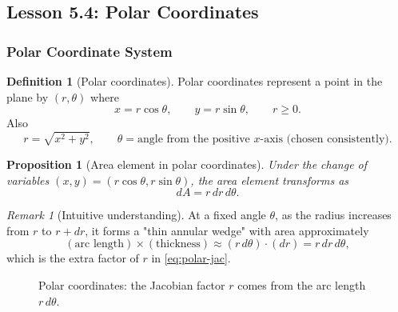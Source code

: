 \documentclass[12pt]{article}
\numberwithin{equation}{section}
\theoremstyle{plain}
\newtheorem{proposition}[theorem]{Proposition}
\theoremstyle{definition}
\newtheorem{definition}[theorem]{Definition}
\theoremstyle{remark}
\newtheorem{remark}[theorem]{Remark}
\begin{document}
\subsection{Lesson 5.4: Polar Coordinates}

\subsubsection{Polar Coordinate System}

\begin{definition}[Polar coordinates]\label{def:polar}
Polar coordinates represent a point in the plane by $(r,\theta)$ where
\[
x=r\cos\theta,\qquad y=r\sin\theta,\qquad r\ge 0.
\]
Also
\[
r=\sqrt{x^2+y^2},\qquad \theta=\text{angle from the positive $x$-axis (chosen consistently).}
\]
\end{definition}

\begin{proposition}[Area element in polar coordinates]\label{prop:polar-area}
Under the change of variables $(x,y)=(r\cos\theta,r\sin\theta)$, the area element transforms as
\begin{equation}\label{eq:polar-jac}
dA = r\,dr\,d\theta.
\end{equation}
\end{proposition}

\begin{remark}[Intuitive understanding]
At a fixed angle $\theta$, as the radius increases from $r$ to $r+dr$, it forms a "thin annular wedge" with area approximately
\[
(\text{arc length})\times(\text{thickness}) \approx (r\,d\theta)\cdot(dr)=r\,dr\,d\theta,
\]
which is the extra factor of $r$ in \cref{eq:polar-jac}.
\end{remark}

\begin{figure}[H]
\centering
{}
\caption{Polar coordinates: the Jacobian factor $r$ comes from the arc length $r\,d\theta$.}
\label{fig:polar-wedge}
\end{figure}
\end{document}
